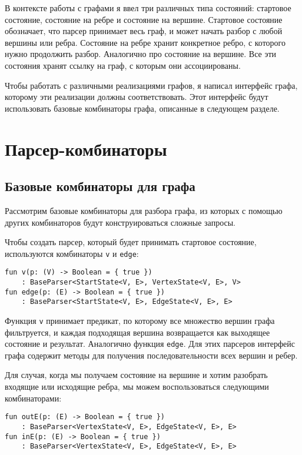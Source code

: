 В контексте работы с графами я ввел три различных типа состояний: стартовое состояние, состояние на ребре и состояние на вершине. Стартовое состояние обозначает, что парсер принимает весь граф, и может начать разбор с любой вершины или ребра. Состояние на ребре хранит конкретное ребро, с которого нужно продолжить разбор. Аналогично про состояние на вершине. Все эти состояния хранят ссылку на граф, с которым они ассоциированы.

Чтобы работать с различными реализациями графов, я написал интерфейс графа, которому эти реализации должны соответствовать. Этот интерфейс будут использовать базовые комбинаторы графа, описанные в следующем разделе.

\section{Парсер-комбинаторы}

\subsection{Базовые комбинаторы для графа}

Рассмотрим базовые комбинаторы для разбора графа, из которых с помощью других комбинаторов будут конструироваться сложные запросы.

Чтобы создать парсер, который будет принимать стартовое состояние, используются комбинаторы \verb|v| и \verb|edge|:

\begin{nobreaks}
    \begin{lstlisting}
fun v(p: (V) -> Boolean = { true })
    : BaseParser<StartState<V, E>, VertexState<V, E>, V>
fun edge(p: (E) -> Boolean = { true })
    : BaseParser<StartState<V, E>, EdgeState<V, E>, E> 
\end{lstlisting}
\end{nobreaks}

Функция \verb|v| принимает предикат, по которому все множество вершин графа фильтруется, и каждая подходящая вершина возвращается как выходящее состояние и результат.
Аналогично функция \verb|edge|.
Для этих парсеров интерфейс графа содержит методы для получения последовательности всех вершин и ребер.

Для случая, когда мы получаем состояние на вершине и хотим разобрать входящие или исходящие ребра, мы можем воспользоваться следующими комбинаторами:

\begin{nobreaks}
\begin{lstlisting}
fun outE(p: (E) -> Boolean = { true })
    : BaseParser<VertexState<V, E>, EdgeState<V, E>, E>
fun inE(p: (E) -> Boolean = { true })
    : BaseParser<VertexState<V, E>, EdgeState<V, E>, E>
\end{lstlisting}
\end{nobreaks}


